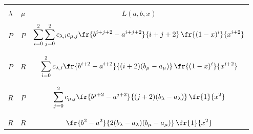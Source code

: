 \begin{table}[b]\small %


\vspace*{-12pt}


\begin{center}




\vspace*{2ex}





\begin{tabular}{|c|c|c|}


\hline


&&\\[-8pt]


{$\lambda$} &  {$\mu$} &  {$L(a,b,x)$} \\[2.5pt]


\hline


&&\\[-9pt]


$P$ & $P$ &  $\displaystyle\sum\limits_{i=0}^{2}\sum\limits_{j=0}^{2}


c_{\lambda,i}c_{\mu,j}\fr{b^{i+j+2}-a^{i+j+2}}{i+j+2}\, \fr{(1-x)^i}{x^{i+2}}$\\


&&\\[-9pt]


\hline


&&\\[-9pt]


$P$ & $R$ &  $\displaystyle\sum\limits_{i=0}^{2}c_{\lambda,i}\fr{b^{i+2}-a^{i+2}}{(i+2)(b_\mu-a_\mu)}\,


 \fr{(1-x)^i}{x^{i+2}}$\\


 &&\\[-9pt]


\hline


&&\\[-9pt]


$R$ & $P$&  $\displaystyle\sum\limits_{j=0}^{2}c_{\mu,j}\fr{b^{j+2}-a^{j+2}}{(j+2)


(b_\lambda-a_\lambda)}\, \fr{1}{x^{2}}$\\


&&\\[-9pt]


\hline


&&\\[-9pt]


$R$ & $R$ &  $\displaystyle\fr{b^{2}-a^{2}}{2(b_\lambda-a_\lambda)(b_\mu-a_\mu)}\, \fr{1}{x^{2}}$\\


\hline


\end{tabular}


\end{center}


\end{table}





